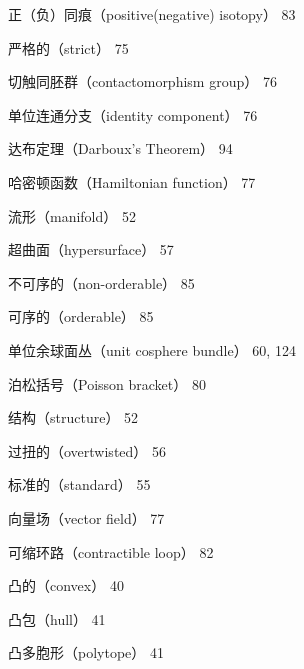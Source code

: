 {\noindent\hspace*{3em}正（负）同痕（positive(negative) isotopy） 83\par
\noindent\hspace*{3em}严格的（strict） 75\par
\noindent\hspace*{1.5em}切触同胚群（contactomorphism group） 76\par
\noindent\hspace*{3em}单位连通分支（identity component） 76\par
\noindent\hspace*{1.5em}达布定理（Darboux's Theorem） 94\par
\noindent\hspace*{1.5em}哈密顿函数（Hamiltonian function） 77\par
\noindent\hspace*{1.5em}流形（manifold） 52\par
\noindent\hspace*{3em}超曲面（hypersurface） 57\par
\noindent\hspace*{3em}不可序的（non-orderable） 85\par
\noindent\hspace*{3em}可序的（orderable） 85\par
\noindent\hspace*{3em}单位余球面丛（unit cosphere bundle） 60, 124\par
\noindent\hspace*{1.5em}泊松括号（Poisson bracket） 80\par
\noindent\hspace*{1.5em}结构（structure） 52\par
\noindent\hspace*{3em}过扭的（overtwisted） 56\par
\noindent\hspace*{3em}标准的（standard） 55\par
\noindent\hspace*{1.5em}向量场（vector field） 77\par
\noindent 可缩环路（contractible loop） 82\par
\noindent 凸的（convex） 40\par
\noindent\hspace*{1.5em}凸包（hull） 41\par
\noindent\hspace*{1.5em}凸多胞形（polytope） 41\par
}
